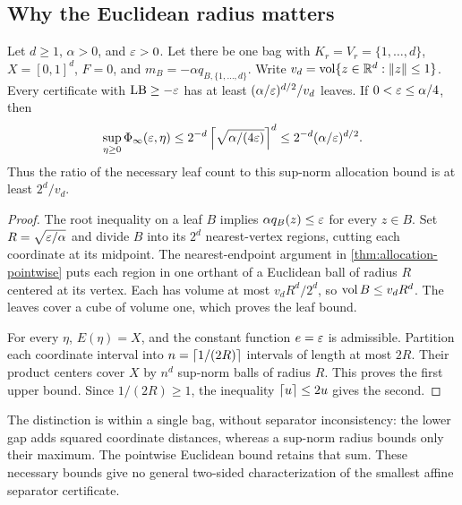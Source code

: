\subsection{Why the Euclidean radius matters}
\begin{proposition}
\label{prop:allocation-flat}
Let $d\ge1$, $\alpha>0$, and $\varepsilon>0$. Let there be one bag with
$K_r=V_r=\{1,\ldots,d\}$, $X=[0,1]^d$, $F=0$, and
$m_B=-\alpha q_{B,\{1,\ldots,d\}}$. Write
$v_d=\operatorname{vol}\{z\in\mathbb R^d:\left\lVert z\right\rVert\le1\}$.
Every certificate with $\mathrm{LB}\ge-\varepsilon$ has at least
$(\alpha/\varepsilon)^{d/2}/v_d$ leaves. If $0<\varepsilon\le\alpha/4$, then
\[
 \sup_{\eta\ge0}\Phi_\infty(\varepsilon,\eta)
 \le2^{-d}\left\lceil \sqrt{\alpha/(4\varepsilon)}\right\rceil^d
 \le2^{-d}(\alpha/\varepsilon)^{d/2}.
\]
Thus the ratio of the necessary leaf count to this sup-norm allocation
bound is at least $2^d/v_d$.
\end{proposition}
\begin{proof}
The root inequality on a leaf $B$ implies $\alpha q_B(z)\le\varepsilon$ for
every $z\in B$. Set $R=\sqrt{\varepsilon/\alpha}$ and divide $B$ into its
$2^d$ nearest-vertex regions, cutting each coordinate at its midpoint.
The nearest-endpoint argument in
\cref{thm:allocation-pointwise} puts each region in one orthant of a
Euclidean ball of radius $R$ centered at its vertex. Each has volume at
most $v_dR^d/2^d$, so $\operatorname{vol} B\le v_dR^d$. The leaves cover a cube of
volume one, which proves the leaf bound.

For every $\eta$, $E(\eta)=X$, and the constant function $e=\varepsilon$ is
admissible. Partition each coordinate interval into
$n=\left\lceil 1/(2R)\right\rceil$ intervals of length at most $2R$. Their product centers
cover $X$ by $n^d$ sup-norm balls of radius $R$. This proves the first
upper bound. Since $1/(2R)\ge1$, the inequality
$\left\lceil u\right\rceil\le2u$ gives the second.
\end{proof}

The distinction is within a single bag, without separator inconsistency:
the lower gap adds squared coordinate distances, whereas a sup-norm
radius bounds only their maximum. The pointwise Euclidean bound retains
that sum. These necessary bounds give no general two-sided
characterization of the smallest affine separator certificate.
